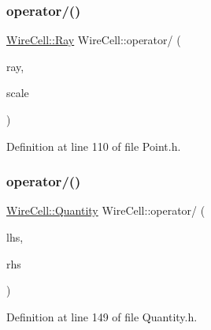 \subsubsection{\texorpdfstring{operator/()}{operator/()}\hspace{0.1cm}{\footnotesize\ttfamily [1/3]}}
{\footnotesize\ttfamily \hyperlink{namespace_wire_cell_a3ab20d9b438feb7eb1ffaab9ba98af0c}{Wire\+Cell\+::\+Ray} Wire\+Cell\+::operator/ (\begin{DoxyParamCaption}\item[{\hyperlink{namespace_wire_cell_a3ab20d9b438feb7eb1ffaab9ba98af0c}{Wire\+Cell\+::\+Ray}}]{ray,  }\item[{const double \&}]{scale }\end{DoxyParamCaption})\hspace{0.3cm}{\ttfamily [inline]}}



Definition at line 110 of file Point.\+h.

\mbox{\label{namespace_wire_cell_a1bd2f1d12492973b304c8caddd3b328a}} 
\subsubsection{\texorpdfstring{operator/()}{operator/()}\hspace{0.1cm}{\footnotesize\ttfamily [2/3]}}
{\footnotesize\ttfamily \hyperlink{class_wire_cell_1_1_quantity}{Wire\+Cell\+::\+Quantity} Wire\+Cell\+::operator/ (\begin{DoxyParamCaption}\item[{const \hyperlink{class_wire_cell_1_1_quantity}{Wire\+Cell\+::\+Quantity} \&}]{lhs,  }\item[{const \hyperlink{class_wire_cell_1_1_quantity}{Wire\+Cell\+::\+Quantity} \&}]{rhs }\end{DoxyParamCaption})\hspace{0.3cm}{\ttfamily [inline]}}



Definition at line 149 of file Quantity.\+h.

\mbox{\label{namespace_wire_cell_ac706a053d10f25428cb3c69160898918}} 
